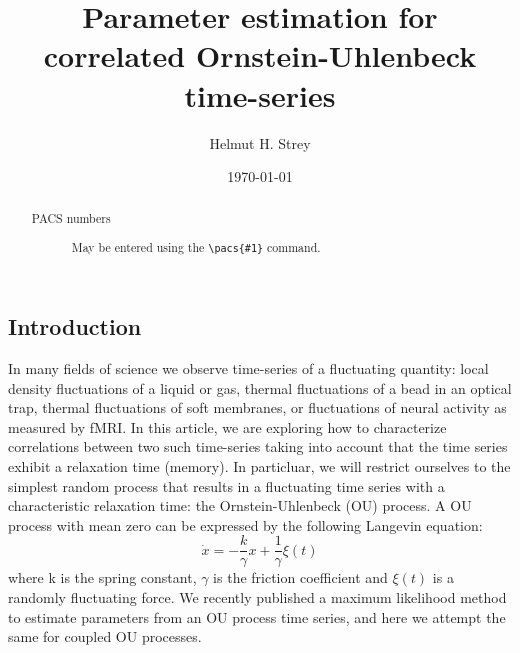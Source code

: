 \documentclass[%
 reprint,
 amsmath,amssymb,
 aps,
]{revtex4-1}
\begin{document}

\title{Parameter estimation for correlated Ornstein-Uhlenbeck time-series}

\author{Helmut H. Strey}

\date{\today}%

\begin{abstract}
\begin{description}
\item[PACS numbers]
May be entered using the \verb+\pacs{#1}+ command.
\end{description}
\end{abstract}

\maketitle

\onecolumngrid
\subsection{Introduction}
In many fields of science we observe time-series of a fluctuating quantity: local density fluctuations of a liquid or gas, thermal fluctuations of a bead in an optical trap, thermal fluctuations of soft membranes, or fluctuations of neural activity as measured by fMRI.  In this article, we are exploring how to characterize correlations between two such time-series taking into account that the time series exhibit a relaxation time (memory).  In particluar, we will restrict ourselves to the simplest random process that results in a fluctuating time series with a characteristic relaxation time: the Ornstein-Uhlenbeck (OU) process.  A OU process with mean zero can be expressed by the following Langevin equation:
\begin{equation}
\dot x =  - \frac{k}{\gamma }x + \frac{1}{\gamma }\xi(t)
\label{model}
\end{equation}
where k is the spring constant, $\gamma$ is the friction coefficient and $\xi(t)$ is a randomly fluctuating force.  
We recently published a maximum likelihood method to estimate parameters from an OU process time series, and here we attempt the same for coupled OU processes.
\end{document}
